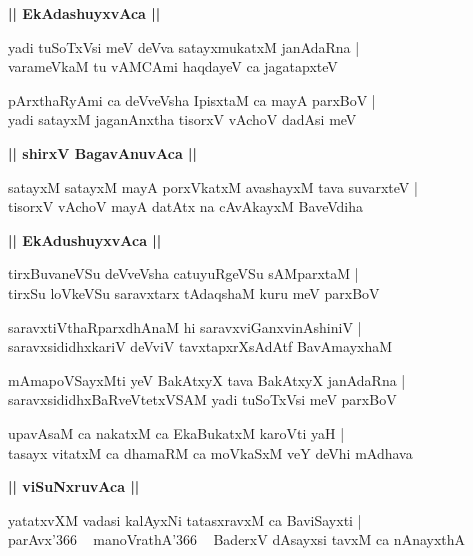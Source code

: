 \documentclass[twoside,12pt,openright]{book}
\newcounter{shloka}[chapter]
\def\uvaca#1{\centerline{{\large\textbf{#1}}}}
\begin{document}
\uvaca{|| EkAdashuyxvAca ||}

\begin{shloka}%
yadi tuSoTxVsi meV deVva satayxmukatxM janAdaRna |\\
varameVkaM tu vAMCAmi haqdayeV ca jagatapxteV 
\end{shloka}

\begin{shloka}%
pArxthaRyAmi ca deVveVsha IpisxtaM ca mayA parxBoV |\\
yadi satayxM jaganAnxtha tisorxV vAchoV dadAsi meV 
\end{shloka}

\uvaca{|| shirxV BagavAnuvAca ||}

\begin{shloka}%
satayxM satayxM mayA porxVkatxM avashayxM tava suvarxteV |\\
tisorxV vAchoV mayA datAtx na cAvAkayxM BaveVdiha 
\end{shloka}

\uvaca{|| EkAdushuyxvAca ||}

\begin{shloka}%
tirxBuvaneVSu deVveVsha catuyuRgeVSu sAMparxtaM |\\
tirxSu loVkeVSu saravxtarx tAdaqshaM kuru meV parxBoV
\end{shloka}

\begin{shloka}%
saravxtiVthaRparxdhAnaM hi saravxviGanxvinAshiniV |\\
saravxsididhxkariV deVviV tavxtapxrXsAdAtf BavAmayxhaM 
\end{shloka}

\begin{shloka}%
mAmapoVSayxMti yeV BakAtxyX tava BakAtxyX janAdaRna |\\
saravxsididhxBaRveVtetxVSAM yadi tuSoTxVsi meV parxBoV
\end{shloka}

\begin{shloka}%
upavAsaM ca nakatxM ca EkaBukatxM karoVti yaH |\\
tasayx vitatxM ca dhamaRM ca moVkaSxM veY deVhi mAdhava 
\end{shloka}

\uvaca{|| viSuNxruvAca ||}

\begin{shloka}%
yatatxvXM vadasi kalAyxNi tatasxravxM ca BaviSayxti |\\
parAvx\char'366 ~ manoVrathA\char'366 ~ BaderxV dAsayxsi tavxM ca nAnayxthA
\end{shloka}
\end{document}

